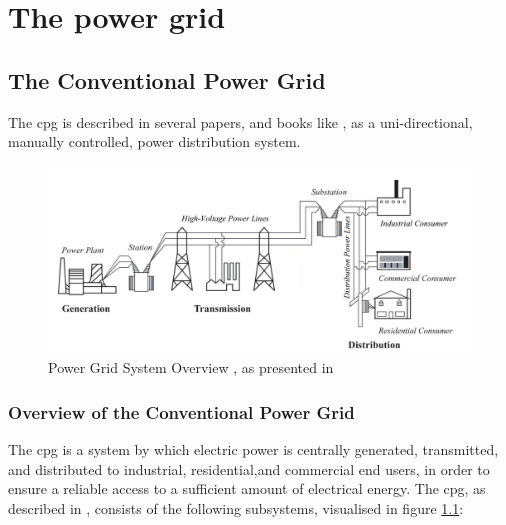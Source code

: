  



\chapter{The power grid}






\section{The Conventional Power Grid}
The \acrfull{cpg} is described in several papers, and books like \cite{BlumeStevenW2007Epsb}, as  a uni-directional, manually controlled, power distribution system.  

\begin{figure}[t]
\includegraphics[width=\linewidth]{figures/Blume-PowerGrid-SystemOverView.png}
\caption[Power Grid System Overview]{Power Grid System Overview , as presented in \cite{BlumeStevenW2007Epsb}}
\label{fig:Blume-PowerGrid-SystemOverView}
\end{figure}



\subsection{Overview of the Conventional Power Grid}
The \acrlong{cpg} is a system by which electric power is centrally generated, transmitted, and distributed to industrial, residential,and commercial end users, in order to ensure a reliable access to a sufficient amount of electrical energy. 
  The \acrlong{cpg}, as described in \cite{BlumeStevenW2007Epsb}, consists of the following subsystems, visualised in figure \ref{fig:Blume-PowerGrid-SystemOverView}:


